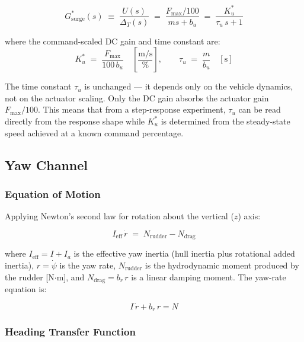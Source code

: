 \documentclass[11pt]{article}
\begin{document}
\begin{equation}
  G_{\mathrm{surge}}^*(s)
  \;\equiv\; \frac{U(s)}{\Delta_T(s)}
  \;=\; \frac{F_{\max}/100}{ms + b_u}
  \;=\; \frac{K_u^*}{\tau_u\,s + 1}
  \label{eq:Gsurge_cmd}
\end{equation}

where the command-scaled DC gain and time constant are:
\[
  K_u^* \;=\; \frac{F_{\max}}{100\,b_u}
  \quad \left[\frac{\mathrm{m/s}}{\%}\right],
  \qquad
  \tau_u \;=\; \frac{m}{b_u} \quad [\mathrm{s}]
\]

The time constant $\tau_u$ is unchanged --- it depends only on the vehicle
dynamics, not on the actuator scaling.  Only the DC gain absorbs the
actuator gain $F_{\max}/100$.  This means that from a step-response
experiment, $\tau_u$ can be read directly from the response shape while
$K_u^*$ is determined from the steady-state speed achieved at a known
command percentage.

\subsection{Yaw Channel}

\subsubsection{Equation of Motion}

Applying Newton's second law for rotation about the vertical ($z$) axis:

\begin{equation}
  I_{\mathrm{eff}}\,\dot{r} \;=\; N_{\mathrm{rudder}} - N_{\mathrm{drag}}
  \label{eq:yaw_newton}
\end{equation}

where $I_{\mathrm{eff}} = I + I_a$ is the effective yaw inertia (hull
inertia plus rotational added inertia), $r = \dot\psi$ is the yaw rate,
$N_{\mathrm{rudder}}$ is the hydrodynamic moment produced by the rudder
[N$\cdot$m], and $N_{\mathrm{drag}} = b_r\,r$ is a linear damping moment.
The yaw-rate equation is:

\begin{equation}
  \boxed{I\,\dot{r} + b_r\,r = N}
  \label{eq:yaw_eom}
\end{equation}

\subsubsection{Heading Transfer Function}
\end{document}

